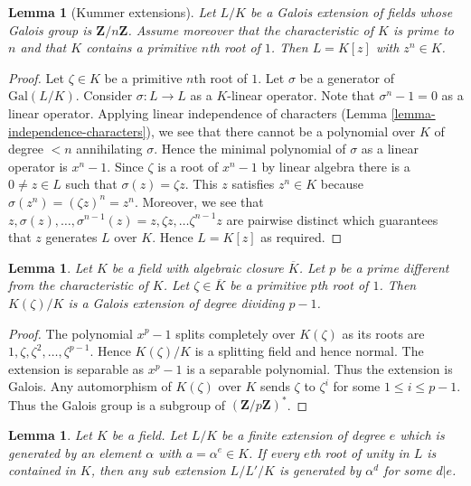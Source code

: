 \documentclass{stacks-project}
\newenvironment{reference}{\comment}{\endcomment}
\theoremstyle{plain}
\newtheorem{lemma}[subsection]{Lemma}
\theoremstyle{definition}
\theoremstyle{remark}
\numberwithin{equation}{subsection}
\begin{document}
\begin{lemma}[Kummer extensions]
\label{lemma-Kummer}
Let $L/K$ be a Galois extension of fields whose Galois group is
$\mathbf{Z}/n\mathbf{Z}$. Assume moreover that the characteristic of $K$
is prime to $n$ and that $K$ contains a primitive $n$th root of $1$.
Then $L = K[z]$ with $z^n \in K$.
\end{lemma}

\begin{proof}
Let $\zeta \in K$ be a primitive $n$th root of $1$.
Let $\sigma$ be a generator of $\text{Gal}(L/K)$.
Consider $\sigma : L \to L$ as a $K$-linear operator.
Note that $\sigma^n - 1 = 0$ as a linear operator.
Applying linear independence of characters
(Lemma \ref{lemma-independence-characters}), we see
that there cannot be a polynomial over $K$ of degree $< n$
annihilating $\sigma$. Hence the minimal polynomial of $\sigma$
as a linear operator is $x^n - 1$. 
Since $\zeta$ is a root of $x^n - 1$ by linear algebra
there is a $0 \neq z \in L$ such that $\sigma(z) = \zeta z$.
This $z$ satisfies $z^n \in K$ because
$\sigma(z^n) = (\zeta z)^n = z^n$. Moreover, we see that
$z, \sigma(z), \ldots, \sigma^{n - 1}(z) =
z, \zeta z, \ldots \zeta^{n - 1} z$ are pairwise distinct
which guarantees that $z$ generates $L$ over $K$.
Hence $L = K[z]$ as required.
\end{proof}

\begin{lemma}
\label{lemma-adjoint-pth-root-unity}
Let $K$ be a field with algebraic closure $\overline{K}$.
Let $p$ be a prime different from the characteristic of $K$.
Let $\zeta \in \overline{K}$ be a primitive $p$th root
of $1$. Then $K(\zeta)/K$ is a Galois extension of degree dividing $p - 1$.
\end{lemma}

\begin{proof}
The polynomial $x^p - 1$ splits completely over
$K(\zeta)$ as its roots are $1, \zeta, \zeta^2, \ldots, \zeta^{p - 1}$.
Hence $K(\zeta)/K$ is a splitting field and hence normal.
The extension is separable as $x^p - 1$ is a separable polynomial.
Thus the extension is Galois. Any automorphism of $K(\zeta)$ over $K$
sends $\zeta$ to $\zeta^i$ for some $1 \leq i \leq p - 1$.
Thus the Galois group is a subgroup of $(\mathbf{Z}/p\mathbf{Z})^*$.
\end{proof}

\begin{lemma}
\label{lemma-subfields-kummer}
\begin{reference}
\cite[Theorem 5.2]{Radical}
\end{reference}
Let $K$ be a field. Let $L/K$ be a finite extension of degree $e$
which is generated by an element $\alpha$ with $a = \alpha^e \in K$.
If every $e$th root of unity in $L$ is contained in $K$, then 
any sub extension $L/L'/K$ is generated by $\alpha^d$ for some $d | e$.
\end{lemma}
\end{document}
